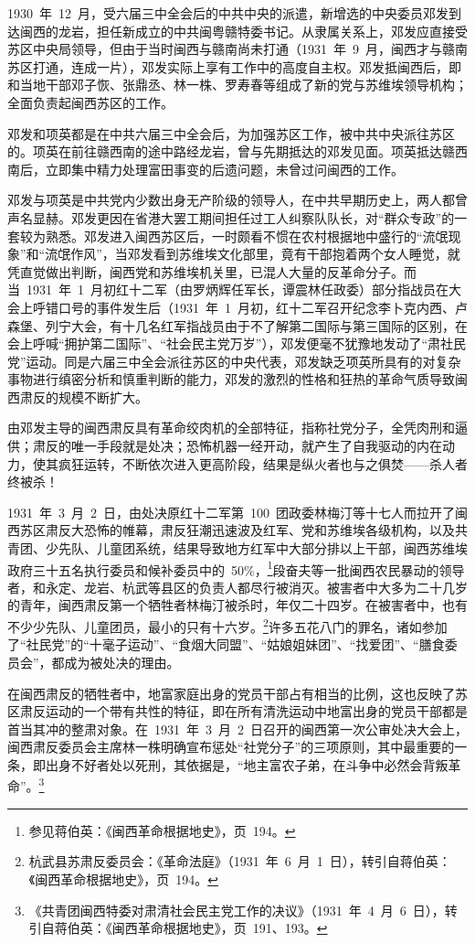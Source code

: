 1930~年~12~月，受六届三中全会后的中共中央的派遣，新增选的中央委员邓发到达闽西的龙岩，担任新成立的中共闽粤赣特委书记。从隶属关系上，邓发应直接受苏区中央局领导，但由于当时闽西与赣南尚未打通（1931~年~9~月，闽西才与赣南苏区打通，连成一片），邓发实际上享有工作中的高度自主权。邓发抵闽西后，即和当地干部邓子恢、张鼎丞、林一株、罗寿春等组成了新的党与苏维埃领导机构；全面负责起闽西苏区的工作。

邓发和项英都是在中共六届三中全会后，为加强苏区工作，被中共中央派往苏区的。项英在前往赣西南的途中路经龙岩，曾与先期抵达的邓发见面。项英抵达赣西南后，立即集中精力处理富田事变的后遗问题，未曾过问闽西的工作。

邓发与项英是中共党内少数出身无产阶级的领导人，在中共早期历史上，两人都曾声名显赫。邓发更因在省港大罢工期间担任过工人纠察队队长，对“群众专政”的一套较为熟悉。邓发进入闽西苏区后，一时颇看不惯在农村根据地中盛行的“流氓现象”和“流氓作风”，当邓发看到苏维埃文化部里，竟有干部抱着两个女人睡觉，就凭直觉做出判断，闽西党和苏维埃机关里，已混人大量的反革命分子。而当~1931~年~1~月初红十二军（由罗炳辉任军长，谭震林任政委）部分指战员在大会上呼错口号的事件发生后（1931~年~1~月初，红十二军召开纪念李卜克内西、卢森堡、列宁大会，有十几名红军指战员由于不了解第二国际与第三国际的区别，在会上呼喊“拥护第二国际”、“社会民主党万岁”），邓发便毫不犹豫地发动了“肃社民党”运动。同是六届三中全会派往苏区的中央代表，邓发缺乏项英所具有的对复杂事物进行缜密分析和慎重判断的能力，邓发的激烈的性格和狂热的革命气质导致闽西肃反的规模不断扩大。

由邓发主导的闽西肃反具有革命绞肉机的全部特征，指称社党分子，全凭肉刑和逼供；肃反的唯一手段就是处决；恐怖机器一经开动，就产生了自我驱动的内在动力，使其疯狂运转，不断依次进入更高阶段，结果是纵火者也与之俱焚——杀人者终被杀！

1931~年~3~月~2~日，由处决原红十二军第~100~团政委林梅汀等十七人而拉开了闽西苏区肃反大恐怖的帷幕，肃反狂潮迅速波及红军、党和苏维埃各级机构，以及共青团、少先队、儿童团系统，结果导致地方红军中大部分排以上干部，闽西苏维埃政府三十五名执行委员和候补委员中的~50\%，\footnote{参见蒋伯英：《闽西革命根据地史》，页~194。}段奋夫等一批闽西农民暴动的领导者，和永定、龙岩、杭武等县区的负责人都尽行被消灭。被害者中大多为二十几岁的青年，闽西肃反第一个牺牲者林梅汀被杀时，年仅二十四岁。在被害者中，也有不少少先队、儿童团员，最小的只有十六岁。\footnote{杭武县苏肃反委员会：《革命法庭》（1931~年~6~月~1~日），转引自蒋伯英：《闽西革命根据地史》，页~194。}许多五花八门的罪名，诸如参加了“社民党”的“十毫子运动”、“食烟大同盟”、“姑娘姐妹团”、“找爱团”、“膳食委员会”，都成为被处决的理由。

在闽西肃反的牺牲者中，地富家庭出身的党员干部占有相当的比例，这也反映了苏区肃反运动的一个带有共性的特征，即在所有清洗运动中地富出身的党员干部都是首当其冲的整肃对象。在~1931~年~3~月~2~日召开的闽西第一次公审处决大会上，闽西肃反委员会主席林一株明确宣布惩处“社党分子”的三项原则，其中最重要的一条，即出身不好者处以死刑，其依据是，“地主富农子弟，在斗争中必然会背叛革命”。\footnote{《共青团闽西特委对肃清社会民主党工作的决议》（1931~年~4~月~6~日），转引自蒋伯英：《闽西革命根据地史》，页~191、193。}

